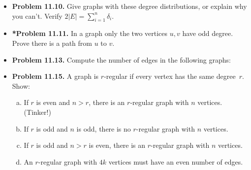 \documentclass[11pt]{article}
\begin{document}
\begin{itemize}
\vspace{0.1in}

\item \textbf{Problem 11.10.}
Give graphs with these degree distributions, or explain why you can't.
Verify $2|E|=\displaystyle\sum_{i=1}^n \delta_i$.
\begin{enumerate}[(a)]
\end{enumerate}

\vspace{0.1in}

\item \textbf{*Problem 11.11.}
In a graph only the two vertices $u,v$ have odd degree.
Prove there is a path from $u$ to $v$.

\vspace{0.1in}

\item \textbf{Problem 11.13.}
Compute the number of edges in the following graphs:
\begin{enumerate}[(a)]
\end{enumerate}

\newpage

\item \textbf{Problem 11.15.}
A graph is $r$-regular if every vertex has the same degree~$r$. Show:
\begin{enumerate}[(a)]
\item If $r$ is even and $n>r$, there is an $r$-regular graph with $n$ vertices. (Tinker!)
\item If $r$ is odd and $n$ is odd, there is no $r$-regular graph with $n$ vertices.
\item If $r$ is odd and $n>r$ is even, there is an $r$-regular graph with $n$ vertices.
\item An $r$-regular graph with $4k$ vertices must have an even number of edges.
\end{enumerate}


\end{itemize}
\end{document}
